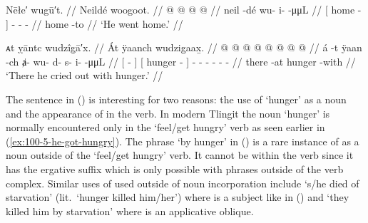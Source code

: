 \ex\label{ex:100-6-he-went-home}%
%
\begingl
	\glpreamble	Nēłe′ wugū′t. //
	\glpreamble	Neildé woogoot. //
	\gla	{}  @ {} {}  @ {} @ {} @ {} //
	\glb	{} neil -dé {} wu- i-  -μμL //
	\glc	{}[ home - {}] - -  - //
	\gld	{} home -to {}  {} {} {} //
	\glft	‘He went home.’
		//
\endgl
\xe

\ex\label{ex:100-7-cry-with-hunger}%
%
\begingl
	\glpreamble	ᴀt ỵāntc wudzîg̣ā′x. //
	\glpreamble	Át ÿaanch wudzig̱aax̱. //
	\gla	{}  @ {} {} {}  @ {} {} 
			 @ {} @ {} @ {} @ {} @ {} @ {} //
	\glb	{} á -t {} {} ÿaan -ch {}
			ⱥ- wu- d- s- i-  -μμL //
	\glc	{}[  - {}] {}[ hunger - {}]
			- - - - -  - //
	\gld	{} there -at {} {} hunger -with {} 
			 {} {} {} {} {} //
	\glft	‘There he cried out with hunger.’
		//
\endgl
\xe

The sentence in (\lastx) is interesting for two reasons: the use of  ‘hunger’ as a noun and the appearance of  in the verb.
In modern Tlingit the noun  ‘hunger’ is normally encountered only in the ‘feel/get hungry’ verb as seen earlier in (\ref{ex:100-5-he-got-hungry}).
The phrase  ‘by hunger’ in (\lastx) is a rare instance of  as a noun outside of the ‘feel/get hungry’ verb.
It cannot be within the verb since it has the ergative suffix  which is only possible with phrases outside of the verb complex.
Similar uses of  used outside of noun incorporation include  ‘s/he died of starvation’ (lit.\ ‘hunger killed him/her’) where  is a subject like in (\lastx) and  ‘they killed him by starvation’ where  is an applicative oblique.

